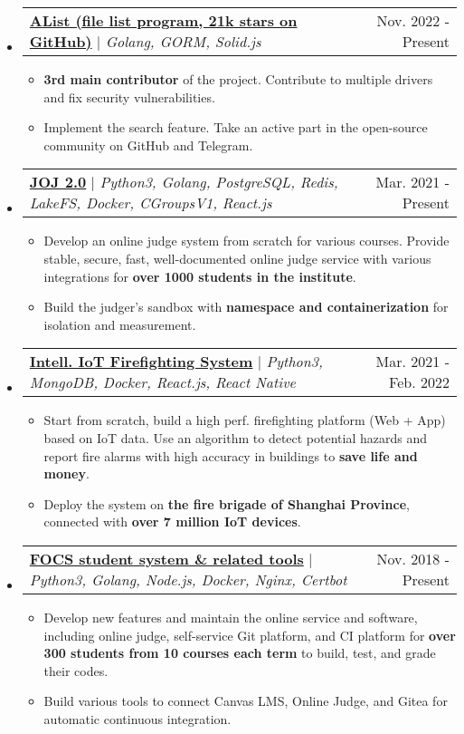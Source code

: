 \documentclass[letterpaper,11pt]{article}
\makeatletter
\newcommand{\resumeItem}[1]{
  \item\small{
    {#1 \vspace{-2pt}}
  }
}
\newcommand{\resumeProjectHeader}[2]{
    \item
    \begin{tabular*}{0.98\textwidth}{l@{\extracolsep{\fill}}r}
      \small#1 & #2 \\
    \end{tabular*}\vspace{-7pt}
}
\newcommand{\resumeSubHeaderListStart}{\begin{itemize}[leftmargin=0.15in, label={}]}
\newcommand{\resumeSubHeaderListEnd}{\end{itemize}}
\newcommand{\resumeItemListStart}{\begin{itemize}}
\newcommand{\resumeItemListEnd}{\end{itemize}\vspace{-5pt}}
\makeatother
\begin{document}
    \resumeSubHeaderListStart
      \resumeProjectHeader
        {\href{https://github.com/alist-org/alist}{\textbf{AList (file list program, 21k stars on GitHub)}} $|$ \emph{Golang, GORM, Solid.js}}{Nov. 2022 - Present}
        \resumeItemListStart
          \resumeItem{\textbf{3rd main contributor} of the project. Contribute to multiple drivers and fix security vulnerabilities.}
          \resumeItem{Implement the search feature. Take an active part in the open-source community on GitHub and Telegram.}
        \resumeItemListEnd
      \resumeProjectHeader
        {\href{https://github.com/joint-online-judge}{\textbf{JOJ 2.0}} $|$ \emph{Python3, Golang, PostgreSQL, Redis, LakeFS, Docker, CGroupsV1, React.js}}{Mar. 2021 - Present}
        \resumeItemListStart
          \resumeItem{Develop an online judge system from scratch for various courses. Provide stable, secure, fast, well-documented online judge service with various integrations for \textbf{over 1000 students in the institute}.}
          \resumeItem{Build the judger's sandbox with \textbf{namespace and containerization} for isolation and measurement.}
        \resumeItemListEnd
      \resumeProjectHeader
        {\href{https://github.com/SJTU-IPP-Firefighting}{\textbf{Intell. IoT Firefighting System}} $|$ \emph{Python3, MongoDB, Docker, React.js, React Native}}{Mar. 2021 - Feb. 2022}
        \resumeItemListStart
          \resumeItem{Start from scratch, build a high perf. firefighting platform (Web + App) based on IoT data. Use an algorithm to detect potential hazards and report fire alarms with high accuracy in buildings to \textbf{save life and money}.}
          \resumeItem{Deploy the system on \textbf{the fire brigade of Shanghai Province}, connected with \textbf{over 7 million IoT devices}.}
        \resumeItemListEnd
      \resumeProjectHeader
        {\href{https://gist.github.com/BoYanZh/fc4469c20fd6adf42c212114532aaac0}{\textbf{FOCS student system \& related tools}} $|$ \emph{Python3, Golang, Node.js, Docker, Nginx, Certbot}}{Nov. 2018 - Present}
        \resumeItemListStart
          \resumeItem{Develop new features and maintain the online service and software, including online judge, self-service Git platform, and CI platform for \textbf{over 300 students from 10 courses each term} to build, test, and grade their codes.}
          \resumeItem{Build various tools to connect Canvas LMS, Online Judge, and Gitea for automatic continuous integration.}
        \resumeItemListEnd
    \resumeSubHeaderListEnd

\end{document}

